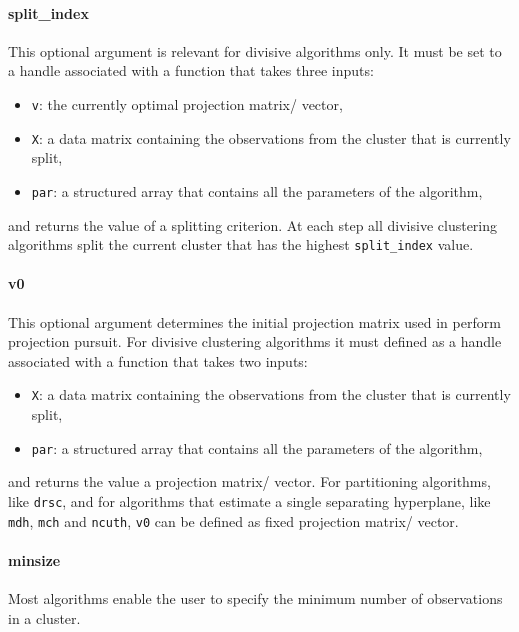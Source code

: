 \documentclass{book}
\begin{document}
\paragraph{split\_index}
%
This optional argument is relevant for divisive algorithms only.
It must be set to a handle associated with a function that 
takes three inputs:
%
\begin{itemize}
	
\item[] {\tt v}: the currently optimal projection matrix/ vector,

\item[] {\tt X}: a data matrix containing the observations from the cluster that is currently split,

\item[] {\tt par}: a structured array that contains all the parameters of the algorithm,

\end{itemize}
%
and returns the value of a splitting criterion. At each step
all divisive clustering algorithms split the current cluster that has the highest
{\tt split\_index} value.

\paragraph{v0}
%
This optional argument determines the initial projection matrix used in
perform projection pursuit. For divisive clustering algorithms it must
defined as a handle associated with a function that takes two inputs:
%
\begin{itemize}
	
\item[] {\tt X}: a data matrix containing the observations from the cluster that is currently split,

\item[] {\tt par}: a structured array that contains all the parameters of the algorithm,

\end{itemize}
%
and returns the value a projection matrix/ vector. 
%
For partitioning algorithms, like {\tt drsc}, and for algorithms that estimate a single
separating hyperplane, like {\tt mdh}, {\tt mch} and {\tt ncuth}, {\tt v0} can be defined
as fixed projection matrix/ vector.

\paragraph{minsize}
%
Most algorithms enable the user to specify the minimum number of observations in a cluster.
\end{document}
